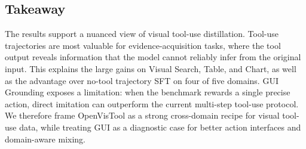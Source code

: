 \subsection{Takeaway}
\label{sec:analysis_takeaway}

The results support a nuanced view of visual tool-use distillation. Tool-use trajectories are most valuable for evidence-acquisition tasks, where the tool output reveals information that the model cannot reliably infer from the original input. This explains the large gains on Visual Search, Table, and Chart, as well as the advantage over no-tool trajectory SFT on four of five domains. GUI Grounding exposes a limitation: when the benchmark rewards a single precise action, direct imitation can outperform the current multi-step tool-use protocol. We therefore frame OpenVisTool as a strong cross-domain recipe for visual tool-use data, while treating GUI as a diagnostic case for better action interfaces and domain-aware mixing.
